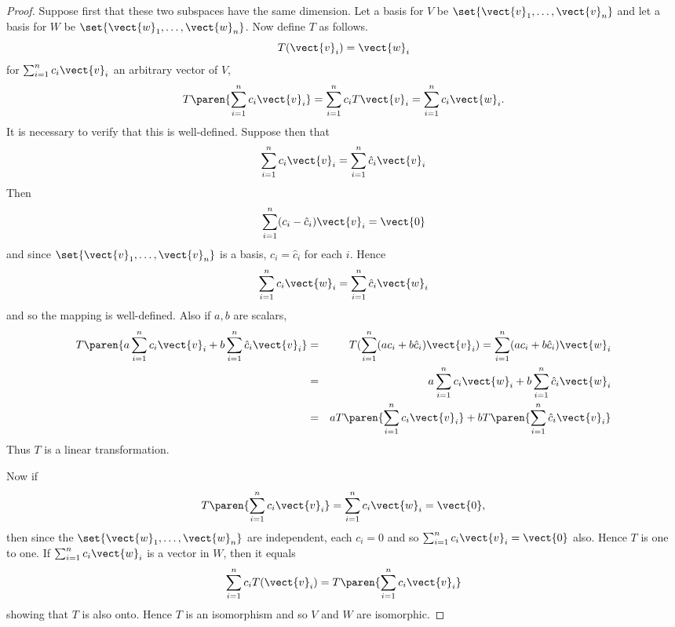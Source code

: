\begin{proof} Suppose first that these two subspaces have the same
dimension. Let a basis for $V$ be $\set{
\vect{v}_{1},\ldots,\vect{v}_{n}} $ and let a basis for $W$ be $
\set{\vect{w}_{1},\ldots,\vect{w}_{n}}$. Now define $T$ as
follows.
\begin{equation*}
T(\vect{v}_{i})=\vect{w}_{i}
\end{equation*}
for $\sum_{i=1}^{n}c_{i}\vect{v}_{i}$ an arbitrary vector of $V$,
\begin{equation*}
T\paren{\sum_{i=1}^{n}c_{i}\vect{v}_{i}} = \sum_{i=1}^{n}c_{i}T
\vect{v}_{i}=\sum_{i=1}^{n}c_{i}\vect{w}_{i}.
\end{equation*}
It is necessary to verify that this is well-defined. Suppose then that
\begin{equation*}
\sum_{i=1}^{n}c_{i}\vect{v}_{i}=\sum_{i=1}^{n}\hat{c}_{i}\vect{v}_{i}
\end{equation*}
Then
\begin{equation*}
\sum_{i=1}^{n}(c_{i}-\hat{c}_{i}) \vect{v}_{i}=\vect{0}
\end{equation*}
and since $\set{\vect{v}_{1},\ldots,\vect{v}_{n}} $ is a basis, $
c_{i}=\hat{c}_{i}$ for each $i$. Hence
\begin{equation*}
\sum_{i=1}^{n}c_{i}\vect{w}_{i}=\sum_{i=1}^{n}\hat{c}_{i}\vect{w}_{i}
\end{equation*}
and so the mapping is well-defined. Also if $a,b$ are scalars,
\begin{eqnarray*}
T\paren{a\sum_{i=1}^{n}c_{i}\vect{v}_{i}+b\sum_{i=1}^{n}\hat{c}_{i}\vect{v}%
_{i}} &=&T(\sum_{i=1}^{n}(ac_{i}+b\hat{c}_{i}) \vect{v%
}_{i}) =\sum_{i=1}^{n}(ac_{i}+b\hat{c}_{i}) \vect{w}_{i} \\
&=&a\sum_{i=1}^{n}c_{i}\vect{w}_{i}+b\sum_{i=1}^{n}\hat{c}_{i}\vect{w}_{i} \\
&=&aT\paren{\sum_{i=1}^{n}c_{i}\vect{v}_{i}} +bT\paren{\sum_{i=1}^{n}%
\hat{c}_{i}\vect{v}_{i}}
\end{eqnarray*}
Thus $T$ is a linear transformation.

Now if
\begin{equation*}
T\paren{\sum_{i=1}^{n}c_{i}\vect{v}_{i}} =\sum_{i=1}^{n}c_{i}\vect{w}%
_{i}=\vect{0},
\end{equation*}
then since the $\set{\vect{w}_{1},\ldots,\vect{w}_{n}} $ are
independent, each $c_{i}=0$ and so $\sum_{i=1}^{n}c_{i}\vect{v}_{i}=\vect{0}$
also. Hence $T$ is one to one. If $\sum_{i=1}^{n}c_{i}\vect{w}_{i}$ is a
vector in $W$, then it equals
\begin{equation*}
\sum_{i=1}^{n}c_{i}T(\vect{v}_{i})=T\paren{\sum_{i=1}^{n}c_{i}\vect{v}_{i}}
\end{equation*}
showing that $T$ is also onto. Hence $T$ is an isomorphism and so $V$ and $W$
are isomorphic.


\end{proof}
